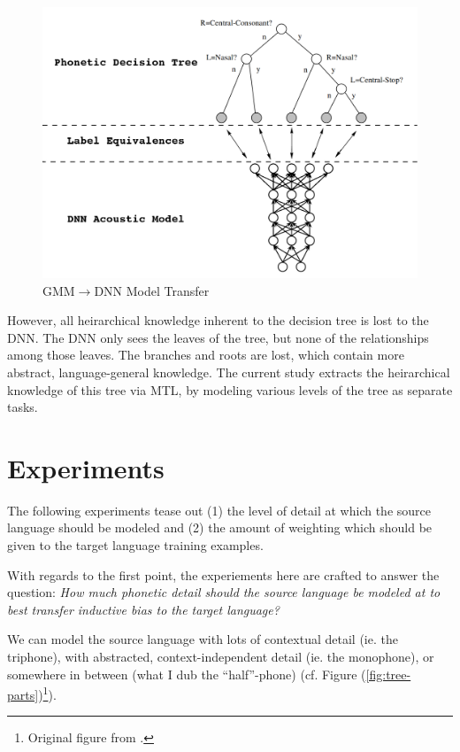 \documentclass[a4paper]{article}
\begin{document}
\begin{figure}[!htbp]
  \centering
{}
  \includegraphics[width=\linewidth]{figs/tree-net.png}
  \caption{GMM$\rightarrow$DNN Model Transfer}
    \label{fig:tree-net}
  \endminipage\hfill
\end{figure}

However, all heirarchical knowledge inherent to the decision tree is lost to the DNN. The DNN only sees the leaves of the tree, but none of the relationships among those leaves. The branches and roots are lost, which contain more abstract, language-general knowledge. The current study extracts the heirarchical knowledge of this tree via MTL, by modeling various levels of the tree as separate tasks. 


\section{Experiments}

The following experiments tease out (1) the level of detail at which the source language should be modeled and (2) the amount of weighting which should be given to the target language training examples.

With regards to the first point, the experiements here are crafted to answer the question: \textit{How much phonetic detail should the source language be modeled at to best transfer inductive bias to the target language?}

We can model the source language with lots of contextual detail (ie. the triphone), with abstracted, context-independent detail (ie. the monophone), or somewhere in between (what I dub the ``half''-phone) (cf. Figure (\ref{fig:tree-parts})\footnote{Original figure from \cite{young2002}.}).
\end{document}
